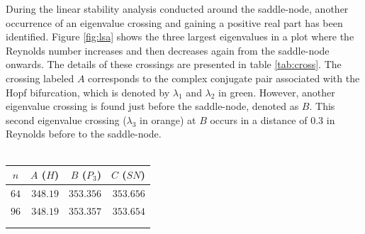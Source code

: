 During the linear stability analysis conducted around the saddle-node, another
occurrence of an eigenvalue crossing and gaining a positive real part has been
identified. Figure \ref{fig:lsa} shows the three largest eigenvalues in a plot
where the Reynolds number increases and then decreases again from the
saddle-node onwards. The details of these crossings are presented in table
\ref{tab:cross}. The crossing labeled $A$ corresponds to the complex conjugate
pair associated with the Hopf bifurcation, which is denoted by $\lambda_1$ and
$\lambda_2$ in green. However, another eigenvalue crossing is found just before
the saddle-node, denoted as $B$. This second eigenvalue crossing ($\lambda_3$
in orange) at $B$ occurs in a distance of $0.3$ in Reynolds before to the
saddle-node. \\\\

\begin{minipage}[h]{\textwidth}
\begin{minipage}[b]{.4\textwidth}
\centering
{}
\label{fig:schem_saddle}
\end{minipage}\hfill
\begin{minipage}[b]{.4\textwidth}
  \centering
  \begin{tabular}{crrr}
  \label{tab:cross}
  $n$ & $A$ ($H$) & $B$ ($P_3$) & $C$ ($SN$) \\
  \hline
  $64$ & $348.19$ & $353.356$ & $353.656$ \\
  $96$ & $348.19$ & $353.357$ & $353.654$ \\
  & & & \\
  & & & \\
\end{tabular}
\end{minipage}
\end{minipage}
\smallskip

